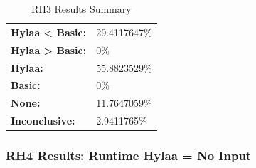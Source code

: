 \documentclass{article}\usepackage[]{graphicx}\usepackage[]{color}
\begin{document}
	\begin{table}[H]
	\centering
	\caption{RH3 Results Summary}
	\begin{tabular}{ll}
	\textbf{Hylaa \textless{} Basic:}& 29.4117647\% \\
	\textbf{Hylaa \textgreater{} Basic:}& 0\%\\
	\textbf{Hylaa:} & 55.8823529\%\\
	\textbf{Basic:} & 0\%\\
	\textbf{None:}& 11.7647059\%\\
	\textbf{Inconclusive:}& 2.9411765\%
			
	
	\end{tabular}
	\end{table}
	
	
	

	
	\subsubsection{RH4 Results: Runtime Hylaa = No Input}
	
\end{document}
